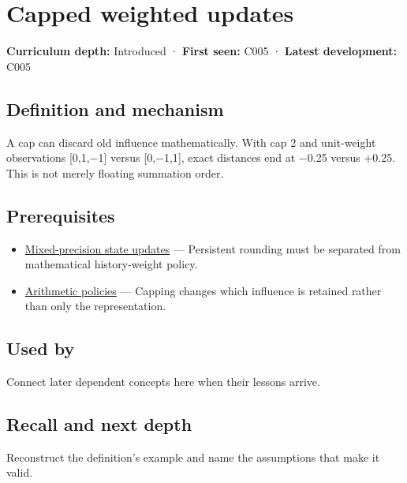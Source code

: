 \hypertarget{appendix-1e45d0613db3}{}
\section{Capped weighted updates}\label{appendix-1e45d0613db3-capped-weighted-updates}

\textbf{Curriculum depth:} Introduced · \textbf{First seen:} C005 · \textbf{Latest development:} C005

\subsection{Definition and mechanism}\label{appendix-1e45d0613db3-definition-and-mechanism}

A cap can discard old influence mathematically. With cap 2 and unit-weight observations {[}0,1,−1{]} versus {[}0,−1,1{]}, exact distances end at −0.25 versus +0.25. This is not merely floating summation order.

\subsection{Prerequisites}\label{appendix-1e45d0613db3-prerequisites}

\begin{itemize}
\tightlist
\item
  \hyperref[appendix-260182e617b7]{Mixed-precision state updates} --- Persistent rounding must be separated from mathematical history-weight policy.
\item
  \hyperref[appendix-2ed044358b82]{Arithmetic policies} --- Capping changes which influence is retained rather than only the representation.
\end{itemize}

\subsection{Used by}\label{appendix-1e45d0613db3-used-by}

Connect later dependent concepts here when their lessons arrive.

\subsection{Recall and next depth}\label{appendix-1e45d0613db3-recall-and-next-depth}

Reconstruct the definition's example and name the assumptions that make it valid.

